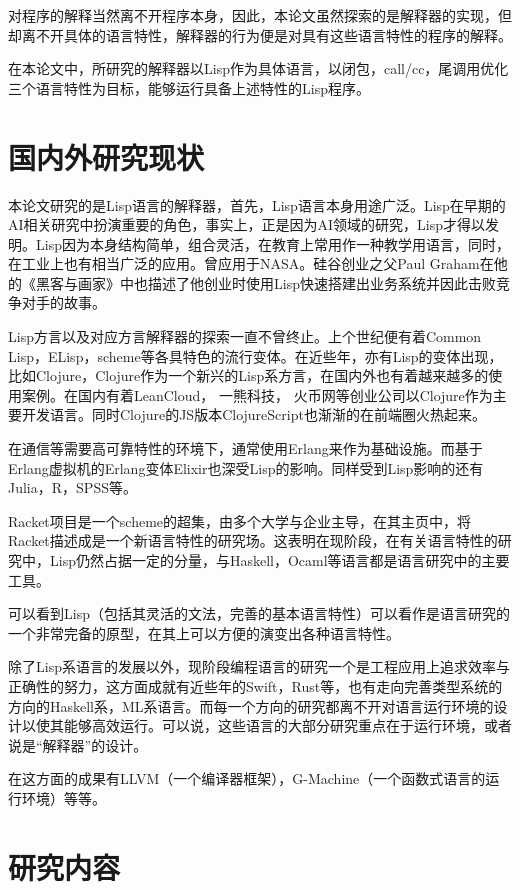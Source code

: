 对程序的解释当然离不开程序本身，因此，本论文虽然探索的是解释器的实现，但却离不开具体的语言特性，解释器的行为便是对具有这些语言特性的程序的解释。

在本论文中，所研究的解释器以Lisp作为具体语言，以闭包，call/cc，尾调用优化三个语言特性为目标，能够运行具备上述特性的Lisp程序。

\section*{国内外研究现状}

本论文研究的是Lisp语言的解释器，首先，Lisp语言本身用途广泛。Lisp在早期的AI相关研究中扮演重要的角色，事实上，正是因为AI领域的研究，Lisp才得以发明。Lisp因为本身结构简单，组合灵活，在教育上常用作一种教学用语言，同时，在工业上也有相当广泛的应用。曾应用于NASA。硅谷创业之父Paul Graham在他的《黑客与画家》中也描述了他创业时使用Lisp快速搭建出业务系统并因此击败竞争对手的故事。

Lisp方言以及对应方言解释器的探索一直不曾终止。上个世纪便有着Common Lisp，ELisp，scheme等各具特色的流行变体。在近些年，亦有Lisp的变体出现，比如Clojure，Clojure作为一个新兴的Lisp系方言，在国内外也有着越来越多的使用案例。在国内有着LeanCloud， 一熊科技， 火币网等创业公司以Clojure作为主要开发语言。同时Clojure的JS版本ClojureScript也渐渐的在前端圈火热起来。

在通信等需要高可靠特性的环境下，通常使用Erlang\cite{armstrong07}来作为基础设施。而基于Erlang虚拟机的Erlang变体Elixir也深受Lisp的影响。同样受到Lisp影响的还有Julia，R，SPSS等。

Racket\cite{plt-tr2010-ref}项目是一个scheme的超集，由多个大学与企业主导，在其主页中，将Racket描述成是一个新语言特性的研究场。这表明在现阶段，在有关语言特性的研究中，Lisp仍然占据一定的分量，与Haskell，Ocaml等语言都是语言研究中的主要工具。

可以看到Lisp（包括其灵活的文法，完善的基本语言特性）可以看作是语言研究的一个非常完备的原型，在其上可以方便的演变出各种语言特性。

除了Lisp系语言的发展以外，现阶段编程语言的研究一个是工程应用上追求效率与正确性的努力，这方面成就有近些年的Swift，Rust等，也有走向完善类型系统的方向的Haskell系，ML系语言。而每一个方向的研究都离不开对语言运行环境的设计以使其能够高效运行。可以说，这些语言的大部分研究重点在于运行环境，或者说是``解释器''的设计。

在这方面的成果有LLVM（一个编译器框架），G-Machine（一个函数式语言的运行环境）等等。

\section*{研究内容}

